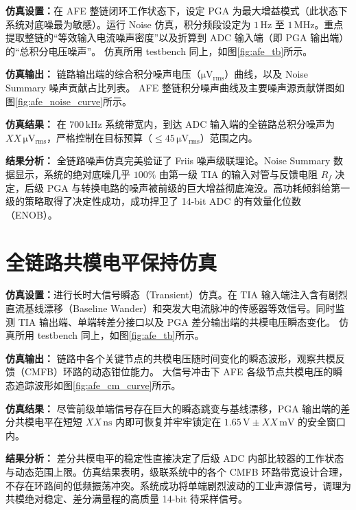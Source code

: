 \textbf{仿真设置：}在 AFE 整链闭环工作状态下，设定 PGA 为最大增益模式（此状态下系统对底噪最为敏感）。运行 Noise 仿真，积分频段设定为 $1\,\mathrm{Hz}$ 至 $1\,\mathrm{MHz}$。重点提取整链的“等效输入电流噪声密度”以及折算到 ADC 输入端（即 PGA 输出端）的“总积分电压噪声”。
仿真所用 testbench 同上，如图\ref{fig:afe_tb}所示。

\textbf{仿真输出：} 链路输出端的综合积分噪声电压（$\mathrm{\mu V_{rms}}$）曲线，以及 Noise Summary 噪声贡献占比列表。
AFE 整链积分噪声曲线及主要噪声源贡献饼图如图\ref{fig:afe_noise_curve}所示。

\textbf{仿真结果：} 在 $700\,\mathrm{kHz}$ 系统带宽内，到达 ADC 输入端的全链路总积分噪声为 $XX\,\mathrm{\mu V_{rms}}$，严格控制在目标预算（$\le 45\,\mathrm{\mu V_{rms}}$）范围之内。

\textbf{结果分析：} 全链路噪声仿真完美验证了 Friis 噪声级联理论。Noise Summary 数据显示，系统的绝对底噪几乎 $100\%$ 由第一级 TIA 的输入对管与反馈电阻 $R_f$ 决定，后级 PGA 与转换电路的噪声被前级的巨大增益彻底淹没。高功耗倾斜给第一级的策略取得了决定性成功，成功捍卫了 14-bit ADC 的有效量化位数（ENOB）。

\section{全链路共模电平保持仿真}

\textbf{仿真设置：}进行长时大信号瞬态（Transient）仿真。在 TIA 输入端注入含有剧烈直流基线漂移（Baseline Wander）和突发大电流脉冲的传感器等效信号。同时监测 TIA 输出端、单端转差分接口以及 PGA 差分输出端的共模电压瞬态变化。
仿真所用 testbench 同上，如图\ref{fig:afe_tb}所示。

\textbf{仿真输出：} 链路中各个关键节点的共模电压随时间变化的瞬态波形，观察共模反馈（CMFB）环路的动态钳位能力。
大信号冲击下 AFE 各级节点共模电压的瞬态追踪波形如图\ref{fig:afe_cm_curve}所示。

\textbf{仿真结果：} 尽管前级单端信号存在巨大的瞬态跳变与基线漂移，PGA 输出端的差分共模电平在短短 $XX\,\mathrm{ns}$ 内即可恢复并牢牢锁定在 $1.65\,\mathrm{V} \pm XX\,\mathrm{mV}$ 的安全窗口内。

\textbf{结果分析：} 差分共模电平的稳定性直接决定了后级 ADC 内部比较器的工作状态与动态范围上限。仿真结果表明，级联系统中的各个 CMFB 环路带宽设计合理，不存在环路间的低频振荡冲突。系统成功将单端剧烈波动的工业声源信号，调理为共模绝对稳定、差分满量程的高质量 14-bit 待采样信号。

